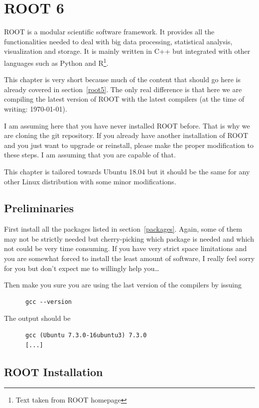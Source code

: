 \chapter{ROOT 6}
ROOT is a modular scientific software framework. It provides all the
functionalities needed to deal with big data processing, statistical
analysis, visualization and storage. It is mainly written in C++ but
integrated with other languages such as Python and R\footnote{Text
  taken from ROOT homepage}.

This chapter is very short because much of the content that should go
here is already covered in section~\ref{root5}. The only real
difference is that here we are compiling the latest version of ROOT with
the latest compilers (at the time of writing: \today).

I am assuming here that you have never installed ROOT before. That is
why we are cloning the git repository. If you already have another
installation of ROOT and you just want to upgrade or reinstall, please
make the proper modification to these steps. I am assuming that you
are capable of that.

This chapter is tailored towards Ubuntu 18.04 but it should be the
same for any other Linux distribution with some minor modifications.

\section{Preliminaries} First install all the packages listed in
section~\ref{packages}. Again, some of them may not be strictly needed
but cherry-picking which package is needed and which not could be very
time consuming. If you have very strict space limitations and you are
somewhat forced to install the least amount of software, I really feel
sorry for you but don't expect me to willingly help you\dots

Then make you sure you are using the last version of the compilers by
issuing
\begin{lstlisting}
      gcc --version
\end{lstlisting}
The output should be
\begin{lstlisting}
      gcc (Ubuntu 7.3.0-16ubuntu3) 7.3.0
      [...]
\end{lstlisting}

\section{ROOT Installation}

